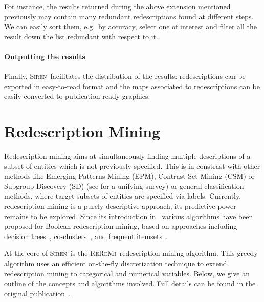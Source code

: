 \documentclass{sig-alternate}
\newcommand{\prg}[1]{\paragraph{#1}}
\newcommand{\Siren}{\textsc{Siren}}
\newcommand{\ReReMi}{\textsc{ReReMi}}
\begin{document}
For instance, the results returned during the above extension
mentioned previously may contain many redundant redescriptions found
at different steps. We can easily sort them, e.g.\ by accuracy, select
one of interest and filter all the result down the list redundant with respect to it.


\prg{Outputting the results}
\label{sec:outputting-results}
Finally, \Siren\ facilitates the distribution of the results:
redescriptions can be exported in easy-to-read format and the
maps associated to redescriptions can be easily converted to
publication-ready graphics. 

\section{Redescription Mining}
Redescription mining aims at simultaneously finding multiple
descriptions of a subset of entities which is not previously
specified.  This is in constrast with other methods like Emerging
Patterns Mining (EPM), Contrast Set Mining (CSM) or Subgroup Discovery
(SD) (see \cite{kralj09supervised} for a unifying survey) or general
classification methods, where target subsets of entities are specified
via labels.  Currently, redescription mining is a purely descriptive
approach, its predictive power remains to be explored.  Since its
introduction in~\cite{ramakrishnan04turning} various algorithms have
been proposed for Boolean redescription mining, based on approaches
including decision
trees~\cite{ramakrishnan04turning,kumar07redescription},
co-clusters~\cite{parida05redescription}, and frequent
itemsets~\cite{gallo08finding}.

At the core of \Siren\ is the \ReReMi\ redescription mining
algorithm. This greedy algorithm uses an efficient on-the-fly
discretization technique to extend redescription mining to categorical
and numerical variables.  Below, we give an outline of the concepts and
algorithms involved. Full details can be found
in the original publication~\cite{galbrun11black}.
\end{document}
